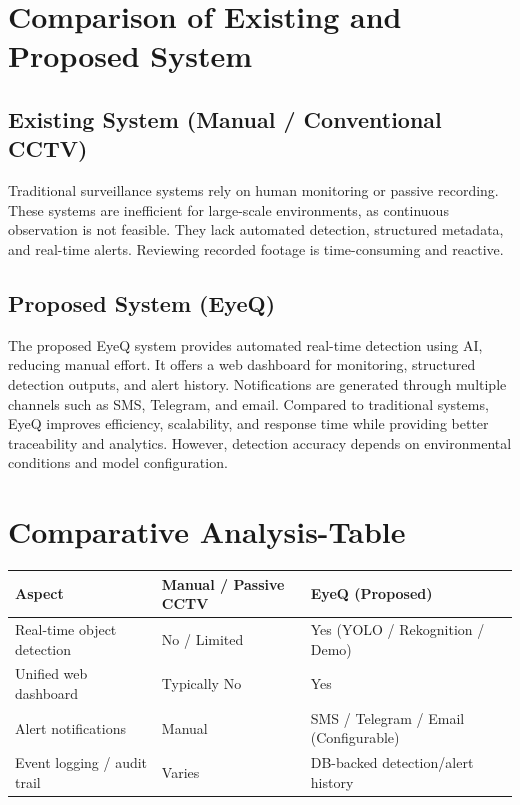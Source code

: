 \documentclass[10pt,openany]{report}
\begin{document}
\begin{sloppypar}
{{{\begin{sloppypar}
\section{Comparison of Existing and Proposed System}

\subsection{Existing System (Manual / Conventional CCTV)}
Traditional surveillance systems rely on human monitoring or passive recording. These systems are inefficient for large-scale environments, as continuous observation is not feasible. They lack automated detection, structured metadata, and real-time alerts. Reviewing recorded footage is time-consuming and reactive.

\subsection{Proposed System (EyeQ)}
The proposed EyeQ system provides automated real-time detection using AI, reducing manual effort. It offers a web dashboard for monitoring, structured detection outputs, and alert history. Notifications are generated through multiple channels such as SMS, Telegram, and email. Compared to traditional systems, EyeQ improves efficiency, scalability, and response time while providing better traceability and analytics. However, detection accuracy depends on environmental conditions and model configuration.
\section{Comparative Analysis-Table}

\begin{table}[H]
\centering
\begin{tabular}{|l|l|l|}
\hline
\textbf{Aspect} & \textbf{Manual / Passive CCTV} & \textbf{EyeQ (Proposed)} \\ \hline

Real-time object detection & No / Limited & Yes (YOLO / Rekognition / Demo) \\ \hline

Unified web dashboard & Typically No & Yes \\ \hline

Alert notifications & Manual & SMS / Telegram / Email (Configurable) \\ \hline

Event logging / audit trail & Varies & DB-backed detection/alert history \\ \hline


\end{tabular}
\end{table}
\end{sloppypar}}}}
\end{sloppypar}
\end{document}
